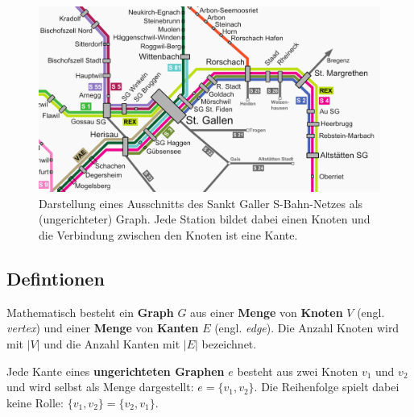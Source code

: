 \begin{figure}[htb]
\begin{center}

\includegraphics[width=.67\textwidth]{../fig/sbahn_netz_ausschnitt.png}
\caption{Darstellung eines Ausschnitts des Sankt Galler S-Bahn-Netzes als (ungerichteter) Graph.
Jede Station bildet dabei einen Knoten und die Verbindung zwischen den Knoten ist eine Kante.
}

\label{fig:sbahn}
\end{center}
\end{figure}


\subsection{Defintionen}

\begin{mdef}
Mathematisch besteht ein \textbf{Graph} $G$ aus einer \textbf{Menge} von \textbf{Knoten} $V$ (engl. \emph{vertex}) und einer \textbf{Menge} von \textbf{Kanten} $E$ (engl. \emph{edge}).
Die Anzahl Knoten wird mit $|V|$ und die Anzahl Kanten mit $|E|$ bezeichnet.
\end{mdef}



\begin{mdef}
Jede Kante eines \textbf{ungerichteten Graphen} $e$ besteht aus zwei Knoten $v_1$ und $v_2$ und wird selbst als Menge dargestellt: $e= \{v_1,v_2\}$.
Die Reihenfolge spielt dabei keine Rolle: $\{v_1,v_2\} = \{v_2,v_1\}$.
\end{mdef}

